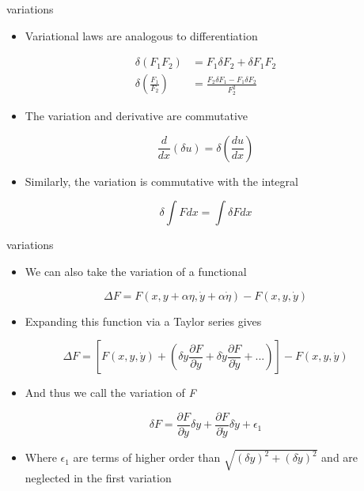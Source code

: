 \documentclass[
  letterpaper,
  ignorenonframetext,
  aspectratio=43,
  handout,
  12pt]{beamer}
\providecommand{\tightlist}{%
  \setlength{\itemsep}{0pt}\setlength{\parskip}{0pt}}
\providecommand{\tightlist}{%
\setlength{\itemsep}{0pt}\setlength{\parskip}{0pt}}
\begin{document}
\begin{frame}{variations}
\protect\hypertarget{variations-2}{}
\begin{itemize}
\tightlist
\item
  Variational laws are analogous to differentiation
\end{itemize}

\[\begin{aligned}
  \delta (F_1 F_2) &= F_1 \delta F_2 + \delta F_1 F_2\\
  \delta \left(\frac{F_1}{F_2} \right) &= \frac{F_2 \delta F_1 - F_1 \delta F_2}{F_2^2}
\end{aligned}\]

\begin{itemize}
\tightlist
\item
  The variation and derivative are commutative
\end{itemize}

\[\frac{d}{dx} (\delta u) = \delta \left(\frac{du}{dx}\right)\]

\begin{itemize}
\tightlist
\item
  Similarly, the variation is commutative with the integral
\end{itemize}

\[\delta \int F dx = \int \delta F dx\]
\end{frame}

\begin{frame}{variations}
\protect\hypertarget{variations-3}{}
\begin{itemize}
\tightlist
\item
  We can also take the variation of a functional
\end{itemize}

\[\Delta F = F(x,y + \alpha \eta, \dot{y} + \alpha \dot{\eta}) - F(x,y,\dot{y})\]

\begin{itemize}
\tightlist
\item
  Expanding this function via a Taylor series gives
\end{itemize}

\[\Delta F = \left [ F(x,y,\dot{y}) + \left( \delta y \frac{\partial F}{\partial y} + \delta \dot{y} \frac{\partial F}{\partial \dot{y}} + ... \right) \right]- F(x,y,\dot{y})\]

\begin{itemize}
\tightlist
\item
  And thus we call the variation of \emph{F}
\end{itemize}

\[\delta F = \frac{\partial F}{\partial y} \delta y + \frac{\partial F}{\partial \dot{y}} \delta \dot{y} + \epsilon_1\]

\begin{itemize}
\tightlist
\item
  Where \(\epsilon_1\) are terms of higher order than
  \(\sqrt{(\delta y)^2 + (\delta \dot{y})^2}\) and are neglected in the
  first variation
\end{itemize}
\end{frame}
\end{document}
